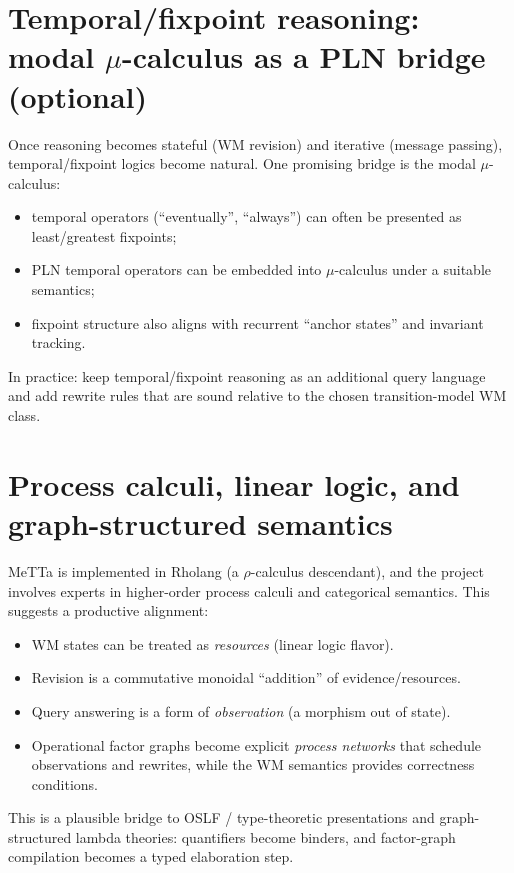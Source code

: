 \documentclass[11pt]{article}
\begin{document}
\section{Temporal/fixpoint reasoning: modal $\mu$-calculus as a PLN bridge (optional)}

Once reasoning becomes stateful (WM revision) and iterative (message passing), temporal/fixpoint
logics become natural. One promising bridge is the modal $\mu$-calculus:

\begin{itemize}[leftmargin=2em]
\item temporal operators (``eventually'', ``always'') can often be presented as least/greatest fixpoints;
\item PLN temporal operators can be embedded into $\mu$-calculus under a suitable semantics;
\item fixpoint structure also aligns with recurrent ``anchor states'' and invariant tracking.
\end{itemize}

In practice: keep temporal/fixpoint reasoning as an additional query language and add rewrite rules
that are sound relative to the chosen transition-model WM class.

\section{Process calculi, linear logic, and graph-structured semantics}

MeTTa is implemented in Rholang (a $\rho$-calculus descendant), and the project involves
experts in higher-order process calculi and categorical semantics.
This suggests a productive alignment:

\begin{itemize}[leftmargin=2em]
\item WM states can be treated as \emph{resources} (linear logic flavor).
\item Revision is a commutative monoidal ``addition'' of evidence/resources.
\item Query answering is a form of \emph{observation} (a morphism out of state).
\item Operational factor graphs become explicit \emph{process networks} that schedule observations
and rewrites, while the WM semantics provides correctness conditions.
\end{itemize}

This is a plausible bridge to OSLF / type-theoretic presentations and graph-structured lambda theories:
quantifiers become binders, and factor-graph compilation becomes a typed elaboration step.
\end{document}
